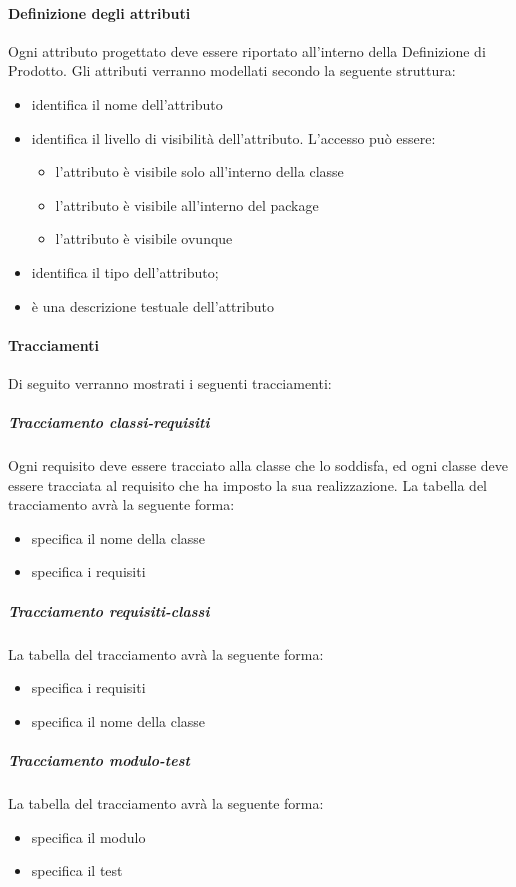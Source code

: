 \paragraph{Definizione degli attributi \\}
Ogni attributo progettato deve essere riportato all'interno della Definizione di Prodotto. Gli attributi verranno modellati secondo la seguente struttura:
\begin{itemize}
\item {}identifica il nome dell'attributo
\item {}identifica il livello di visibilità dell'attributo. L'accesso può essere:
	\begin{itemize}
	\item {}l'attributo è visibile solo all'interno della classe
	\item {}l'attributo è visibile all'interno del package
	\item {}l'attributo è visibile ovunque
	\end{itemize}
\item {}identifica il tipo dell'attributo;
\item {}è una descrizione testuale dell'attributo
\end{itemize}

\paragraph{Tracciamenti\\}
Di seguito verranno mostrati i seguenti tracciamenti:
\label{}
\subparagraph{Tracciamento classi-requisiti \\}
Ogni requisito deve essere tracciato alla classe che lo soddisfa, ed ogni classe deve essere tracciata al requisito che ha imposto la sua realizzazione.
La tabella del tracciamento avrà la seguente forma:
\begin{itemize}
\item {}specifica il nome della classe
\item {}specifica i requisiti
\end{itemize}
\subparagraph{Tracciamento requisiti-classi \\}
La tabella del tracciamento avrà la seguente forma:
\begin{itemize}
\item {}specifica i requisiti
\item {}specifica il nome della classe
\end{itemize}
\subparagraph{Tracciamento modulo-test \\}
La tabella del tracciamento avrà la seguente forma:
\begin{itemize}
\item {}specifica il modulo
\item {}specifica il test
\end{itemize}


